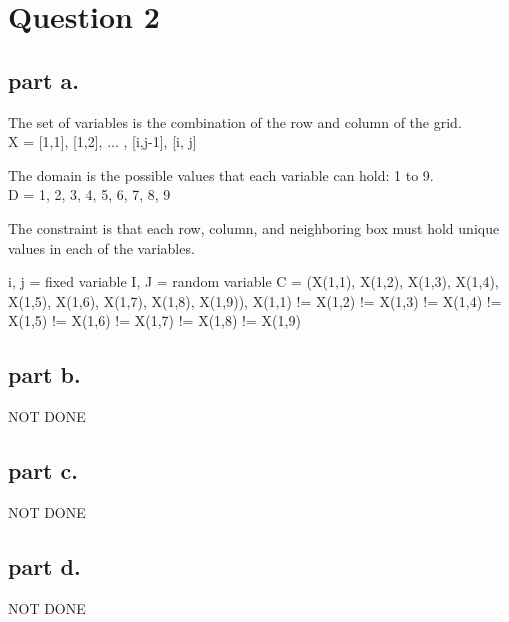 \section{Question 2}

\subsection{part a.}
The set of variables is the combination of the row and column of the grid. \\
X = {[1,1], [1,2], ... , [i,j-1], [i, j]}

The domain is the possible values that each variable can hold: 1 to 9.\\
D = {1, 2, 3, 4, 5, 6, 7, 8, 9}

The constraint is that each row, column, and neighboring box must hold unique values in each of the variables.

i, j = fixed variable
I, J = random variable
C = {(X(1,1), X(1,2), X(1,3), X(1,4), X(1,5), X(1,6), X(1,7), X(1,8), X(1,9)), X(1,1) != X(1,2) != X(1,3) != X(1,4) != X(1,5) != X(1,6) != X(1,7) != X(1,8) != X(1,9)}

\subsection{part b.}
NOT DONE

\subsection{part c.}
NOT DONE

\subsection{part d.}
NOT DONE

